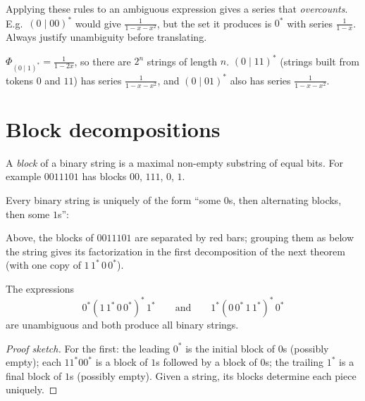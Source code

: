 \begin{important}[Pitfall]
Applying these rules to an ambiguous expression gives a series that \emph{overcounts}. E.g.\
$(0\mid 00)^*$ would give $\frac{1}{1-x-x^2}$, but the set it produces is $0^*$ with series
$\frac{1}{1-x}$. Always justify unambiguity before translating.
\end{important}

\begin{example}
$\Phi_{(0\mid1)^*} = \frac{1}{1-2x}$, so there are $2^n$ strings of length $n$.
$(0\mid11)^*$ (strings built from tokens $0$ and $11$) has series $\frac{1}{1-x-x^2}$, and
$(0 \mid 01)^*$ also has series $\frac{1}{1-x-x^2}$.
\end{example}

\section{Block decompositions}

\begin{definition}[Block]
A \emph{block} of a binary string is a maximal non-empty substring of equal bits. For example
$0011101$ has blocks $00$, $111$, $0$, $1$.
\end{definition}

Every binary string is uniquely of the form ``some $0$s, then alternating blocks, then some $1$s'':

\begin{center}
\end{center}
Above, the blocks of $0011101$ are separated by red bars; grouping them as below the string
gives its factorization in the first decomposition of the next theorem (with one copy of
$1\,1^*\,0\,0^*$).

\begin{theorem}
The expressions
\[
0^*(1\,1^*\,0\,0^*)^*\,1^* \qquad\text{and}\qquad 1^*(0\,0^*\,1\,1^*)^*\,0^*
\]
are unambiguous and both produce all binary strings.
\end{theorem}
\begin{proof}[Proof sketch]
For the first: the leading $0^*$ is the initial block of $0$s (possibly empty); each $11^*00^*$
is a block of $1$s followed by a block of $0$s; the trailing $1^*$ is a final block of $1$s
(possibly empty). Given a string, its blocks determine each piece uniquely.
\end{proof}

